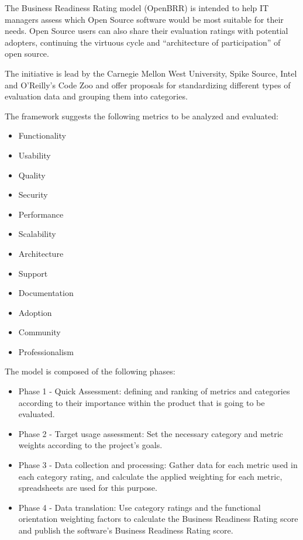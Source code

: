 \documentclass[a4paper,12pt]{book}
\begin{document}
The Business Readiness Rating model (OpenBRR)\cite{OpenBRRWhitepaper} is
intended to help IT managers assess which Open Source software would be most suitable for their needs. Open Source users can also share their evaluation ratings with potential adopters, continuing the virtuous cycle and “architecture of participation” of open
source.

The initiative\cite{The OpenBRR Corporate Community}  is lead by the Carnegie Mellon West University, Spike Source, Intel and O’Reilly’s Code Zoo and offer proposals for standardizing different types of evaluation data and grouping them into categories.

The framework suggests the following metrics to be analyzed and evaluated:
\begin{itemize}
\item Functionality
\item Usability
\item Quality
\item Security
\item Performance
\item Scalability
\item Architecture
\item Support
\item Documentation
\item Adoption
\item Community
\item Professionalism
\end{itemize}

The model is composed of the following phases:
\begin{itemize}
\item Phase 1 - Quick Assessment: defining and ranking of metrics and categories according to their importance within the product that is going to be evaluated.
\item Phase 2 - Target usage assessment: Set the necessary category and metric weights according to the project's goals.
\item Phase 3 - Data collection and processing: Gather data for each metric used in each category rating, and calculate the applied weighting for each metric, spreadsheets are used for this purpose.
\item Phase 4 - Data translation: Use category ratings and the functional orientation weighting factors to calculate the Business Readiness Rating score and publish the software’s Business Readiness Rating score.
\end{itemize}
\end{document}
